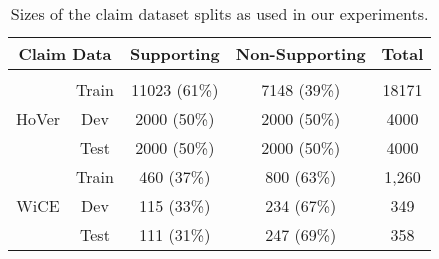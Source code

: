 \begin{table}[htpb!]
\centering
\begin{tabular}{c c c c c}
\multicolumn{2}{c}{Claim Data} & Supporting & Non-Supporting & Total \\
\hline 
\\
\multirow{3}{*}{HoVer} & Train & 11023 (61\%) & 7148 (39\%) & 18171 \\
                       & Dev & 2000 (50\%) & 2000 (50\%) & 4000 \\
                       & Test & 2000 (50\%) & 2000 (50\%) & 4000 \\[5mm]
                       
\multirow{3}{*}{WiCE} & Train & 460 (37\%) & 800 (63\%) & 1,260 \\
                       & Dev & 115 (33\%) & 234 (67\%) & 349 \\
                       & Test & 111 (31\%) & 247 (69\%) & 358 \\[5mm]

\hline
\end{tabular}
\caption{Sizes of the claim dataset splits as used in our experiments.}
\label{tab:claim_dataset_sizes}
\end{table}